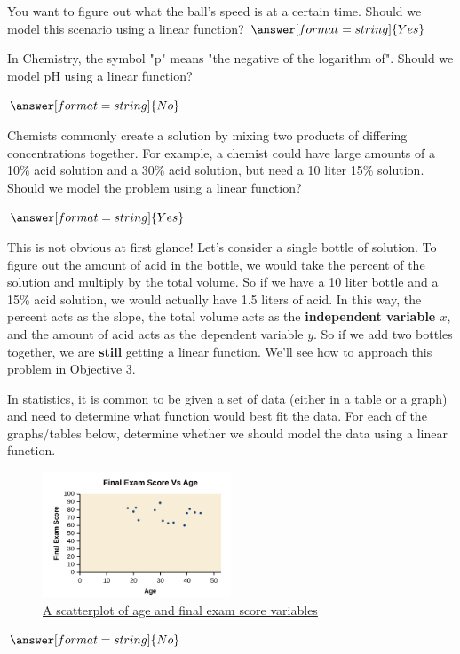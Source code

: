 \documentclass{ximera}
\begin{document}
\begin{question}
You want to figure out what the ball's speed is at a certain time. Should we model this scenario using a linear function?
$\answer[format=string]{Yes}$
\end{question}

\begin{question}
In Chemistry, the symbol "p" means "the negative of the logarithm of". Should we model pH using a linear function? 

$\answer[format=string]{No}$
\end{question}

\begin{question}
Chemists commonly create a solution by mixing two products of differing concentrations together. For example, a chemist could have large amounts of a 10\% acid solution and a 30\% acid solution, but need a 10 liter 15\% solution. Should we model the problem using a linear function?

$\answer[format=string]{Yes}$

\begin{feedback}
This is not obvious at first glance! Let's consider a single bottle of solution. To figure out the amount of acid in the bottle, we would take the percent of the solution and multiply by the total volume. So if we have a 10 liter bottle and a 15\% acid solution, we would actually have 1.5 liters of acid. In this way, the percent acts as the slope, the total volume acts as the \textbf{independent variable $x$}, and the amount of acid acts as the dependent variable $y$. So if we add two bottles together, we are \textbf{still} getting a linear function. We'll see how to approach this problem in Objective 3.
\end{feedback}

\end{question}

In statistics, it is common to be given a set of data (either in a table or a graph) and need to determine what function would best fit the data. For each of the graphs/tables below, determine whether we should model the data using a linear function. 
\begin{question}
\begin{figure}
\includegraphics[width=0.5\textwidth]{finalExamVsAge.png}
\caption{\href{https://cnx.org/contents/mwjClAV_@8.12:6dX4RGdg@12/Fitting-Linear-Models-to-Data}{A scatterplot of age and final exam score variables}}
\end{figure}
$\answer[format=string]{No}$
\end{question}
\end{document}
